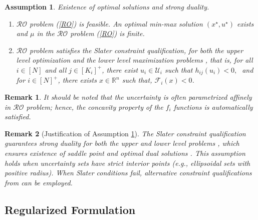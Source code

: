 \documentclass[journal,twoside,web]{ieeecolor}
\newcommand{\rev}[1]{\textcolor{revisionblue}{#1}}
\newtheorem{assumption}[theorem]{Assumption}
\newtheorem{remark}{Remark}
\begin{document}
\begin{assumption} \label{assume_feasible} Existence of optimal solutions and strong duality.

\begin{enumerate}
\item $\mathcal{RO}$ problem (\ref{RO}) is feasible. An optimal min-max solution $(x^\star,u^\star)$ exists and $\mu$ in the $\mathcal{RO}$ problem (\ref{RO}) is finite.
\item $\mathcal{RO}$ problem satisfies the Slater constraint qualification, for both the upper level optimization and the lower level maximization problems
 \cite{bental2009-2}, that is,
for all $i\in[N]$ and all $j\in[K_i]^+$, there exist $u_i \in \mathcal{U}_i$ such that $h_{ij}(u_i)<0,\;$  and
for $i\in[N]^+$,  there exists $x \in \mathbb{R}^n$ such that, $\mathcal{F}_i(x)<0$\;.
\end{enumerate}
\end{assumption}
\begin{remark}
    It should be noted that the uncertainty is often parametrized affinely in $\mathcal{RO}$ problem; hence, the concavity property of the $f_i$ functions is automatically satisfied.
\end{remark}
\begin{remark}[\rev{Justification of Assumption \ref{assume_feasible}}] \label{strong_duality_rem}
The Slater constraint qualification guarantees strong duality for both the upper and lower level problems \cite[Section~5.2.3, 5.9.1]{boyd2004}, which ensures existence of saddle point and optimal dual solutions \cite{bental2009-2}. This assumption holds when uncertainty sets have strict interior points (e.g., ellipsoidal sets with positive radius). When Slater conditions fail, alternative constraint qualifications from \cite{jeyakumar2010} can be employed.
\end{remark}

\subsection*{\rev{Regularized Formulation}}
\end{document}
